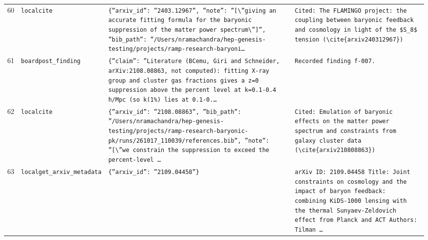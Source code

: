 \documentclass[11pt,a4paper]{article}
\begin{document}
\begin{longtable}{@{}p{}p{}p{}p{}@{}}
60 & \texttt{local}\newline\texttt{cite} & \texttt{\{''arxiv\_\allowbreak{}id'':\allowbreak{} ''2403.12967'',\allowbreak{} ''note'':\allowbreak{} ''[\textbackslash{}\allowbreak{}''giving an accurate fitting formula for the baryonic suppression of the matter power spectrum\textbackslash{}\allowbreak{}'']\allowbreak{}'',\allowbreak{} ''bib\_\allowbreak{}path'':\allowbreak{} ''/\allowbreak{}Users/\allowbreak{}nramachandra/\allowbreak{}hep-genesis-testing/\allowbreak{}projects/\allowbreak{}ramp-research-baryoni\ldots{}\allowbreak{}} & \texttt{Cited:\allowbreak{} The FLAMINGO project:\allowbreak{} the coupling between baryonic feedback and cosmology in light of the \$S\_\allowbreak{}8\$ tension (\textbackslash{}\allowbreak{}cite\{arxiv240312967\}\allowbreak{})\allowbreak{}} \\
61 & \texttt{board}\newline\texttt{post\_\allowbreak{}finding} & \texttt{\{''claim'':\allowbreak{} ''Literature (BCemu,\allowbreak{} Giri and Schneider,\allowbreak{} arXiv:\allowbreak{}2108.08863,\allowbreak{} not computed)\allowbreak{}:\allowbreak{} fitting X-ray group and cluster gas fractions gives a z=\allowbreak{}0 suppression above the percent level at k=\allowbreak{}0.1-0.4 h/\allowbreak{}Mpc (so k(1\%)\allowbreak{} lies at 0.1-0.\ldots{}\allowbreak{}} & \texttt{Recorded finding f-007.} \\
62 & \texttt{local}\newline\texttt{cite} & \texttt{\{''arxiv\_\allowbreak{}id'':\allowbreak{} ''2108.08863'',\allowbreak{} ''bib\_\allowbreak{}path'':\allowbreak{} ''/\allowbreak{}Users/\allowbreak{}nramachandra/\allowbreak{}hep-genesis-testing/\allowbreak{}projects/\allowbreak{}ramp-research-baryonic-pk/\allowbreak{}runs/\allowbreak{}261017\_\allowbreak{}110039/\allowbreak{}references.bib'',\allowbreak{} ''note'':\allowbreak{} ''[\textbackslash{}\allowbreak{}''we constrain the suppression to exceed the percent-level \ldots{}\allowbreak{}} & \texttt{Cited:\allowbreak{} Emulation of baryonic effects on the matter power spectrum and constraints from galaxy cluster data (\textbackslash{}\allowbreak{}cite\{arxiv210808863\}\allowbreak{})\allowbreak{}} \\
63 & \texttt{local}\newline\texttt{get\_\allowbreak{}arxiv\_\allowbreak{}metadata} & \texttt{\{''arxiv\_\allowbreak{}id'':\allowbreak{} ''2109.04458''\}\allowbreak{}} & \texttt{arXiv ID:\allowbreak{} 2109.04458 Title:\allowbreak{} Joint constraints on cosmology and the impact of baryon feedback:\allowbreak{} combining KiDS-1000 lensing with the thermal Sunyaev-Zeldovich effect from Planck and ACT Authors:\allowbreak{} Tilman \ldots{}\allowbreak{}} \\

\end{longtable}
\end{document}
